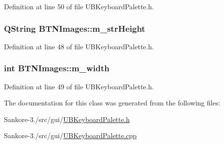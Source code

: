 Definition at line 50 of file U\-B\-Keyboard\-Palette.\-h.

\hypertarget{class_b_t_n_images_a681868e8aeff0afb948f9cbc5ad2c598}{
\subsubsection[{m\-\_\-str\-Height}]{\setlength{\rightskip}{0pt plus 5cm}Q\-String B\-T\-N\-Images\-::m\-\_\-str\-Height}}\label{d2/d5c/class_b_t_n_images_a681868e8aeff0afb948f9cbc5ad2c598}


Definition at line 48 of file U\-B\-Keyboard\-Palette.\-h.

\hypertarget{class_b_t_n_images_a1bca0a9667b862ef43c838987e19962c}{
\subsubsection[{m\-\_\-width}]{\setlength{\rightskip}{0pt plus 5cm}int B\-T\-N\-Images\-::m\-\_\-width}}\label{d2/d5c/class_b_t_n_images_a1bca0a9667b862ef43c838987e19962c}


Definition at line 49 of file U\-B\-Keyboard\-Palette.\-h.



The documentation for this class was generated from the following files\-:\begin{DoxyCompactItemize}
\item 
Sankore-\/3./src/gui/\hyperlink{_u_b_keyboard_palette_8h}{U\-B\-Keyboard\-Palette.\-h}\item 
Sankore-\/3./src/gui/\hyperlink{_u_b_keyboard_palette_8cpp}{U\-B\-Keyboard\-Palette.\-cpp}\end{DoxyCompactItemize}
